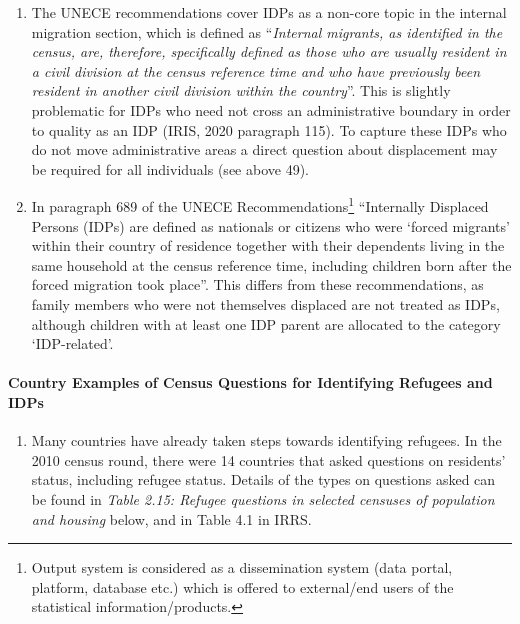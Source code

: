 \documentclass[
]{article}
\providecommand{\tightlist}{%
  \setlength{\itemsep}{0pt}\setlength{\parskip}{0pt}}
\begin{document}
\begin{enumerate}
\def\labelenumi{\arabic{enumi}.}
\setcounter{enumi}{97}
\item
  The UNECE recommendations cover IDPs as a non-core topic in the
  internal migration section, which is defined as ``\emph{Internal migrants,
  as identified in the census, are, therefore, specifically defined as
  those who are usually resident in a civil division at the} \emph{census
  reference time and who have previously been resident in another
  civil division within the country}''. This is slightly problematic
  for IDPs who need not cross an administrative boundary in order to
  quality as an IDP (IRIS, 2020 paragraph 115). To capture these IDPs
  who do not move administrative areas a direct question about
  displacement may be required for all individuals (see above 49).
\item
  In paragraph 689 of the UNECE Recommendations\footnote{Output system is considered as a dissemination system (data
    portal, platform, database etc.) which is offered to external/end
    users of the statistical information/products.} ``Internally
  Displaced Persons (IDPs) are defined as nationals or citizens who
  were `forced migrants' within their country of residence together
  with their dependents living in the same household at the census
  reference time, including children born after the forced migration
  took place''. This differs from these recommendations, as family
  members who were not themselves displaced are not treated as IDPs,
  although children with at least one IDP parent are allocated to the
  category `IDP-related'.
\end{enumerate}

\hypertarget{a.3.-country-examples-of-census-questions-for-identifying-refugees-and-idps}{%
\paragraph{Country Examples of Census Questions for Identifying Refugees and IDPs}\label{a.3.-country-examples-of-census-questions-for-identifying-refugees-and-idps}}

\begin{enumerate}
\def\labelenumi{\arabic{enumi}.}
\setcounter{enumi}{99}
\tightlist
\item
  Many countries have already taken steps towards identifying
  refugees. In the 2010 census round, there were 14 countries that
  asked questions on residents' status, including refugee status.
  Details of the types on questions asked can be found in \emph{Table 2.15:
  Refugee questions in selected censuses of population and housing}
  below, and in Table 4.1 in IRRS.
\end{enumerate}
\end{document}
